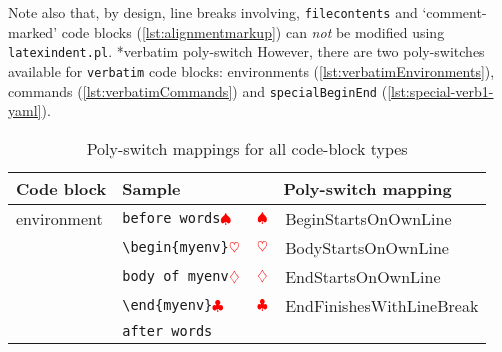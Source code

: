 	Note also that, by design, line breaks involving, \texttt{filecontents} and
	`comment-marked' code blocks (\vref{lst:alignmentmarkup}) can \emph{not} be modified
	using \texttt{latexindent.pl}.%
	*{verbatim poly-switch} However, there are two poly-switches
	available for \texttt{verbatim} code blocks: environments
	(\vref{lst:verbatimEnvironments}), commands (\vref{lst:verbatimCommands}) and
	\texttt{specialBeginEnd} (\vref{lst:special-verb1-yaml}).

	\clearpage
	\begin{longtable}{llll}
		\caption{Poly-switch mappings for all code-block types}\label{tab:poly-switch-mapping}                                                                                                                                                   \\
		\toprule
		Code block                                             & Sample                                                            & \multicolumn{2}{c}{Poly-switch mapping}                                                                     \\
		\midrule
		environment                                            & \verb!before words!$\color{red}\spadesuit$                        & $\color{red}\spadesuit$                 & BeginStartsOnOwnLine                                              \\
		                                                       & \verb!\begin{myenv}!$\color{red}\heartsuit$                        & $\color{red}\heartsuit$                  & BodyStartsOnOwnLine                                               \\
		                                                       & \verb!body of myenv!$\color{red}\diamondsuit$                         & $\color{red}\diamondsuit$                   & EndStartsOnOwnLine                                                \\
		                                                       & \verb!\end{myenv}!$\color{red}\clubsuit$                     & $\color{red}\clubsuit$             & EndFinishesWithLineBreak                                          \\
		                                                       & \verb!after words!                                                &                                         &                                                                   \\

\end{longtable}
